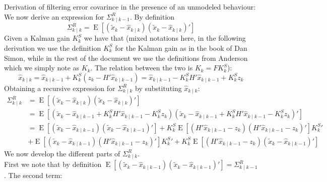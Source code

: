 \documentclass[oneside,12pt]{article}
\begin{document}
%
Derivation of filtering error covarince in the presence of an unmodeled behaviour:
We now derive an expression for $\Sigma^R_{k \mid k-1}$. By definition
%
\begin{equation}\label{eq:errCov_Real}
    \Sigma^R_{k \mid k} = \operatorname{E}\left[ (\tilde{x}_k - \hat{x}_{k \mid k}) (\tilde{x}_k - \hat{x}_{k \mid k})'\right]
\end{equation}
%
Given a Kalman gain $K_k^{S}$ we have that (mixed notations here, in the following derivation we use the definition $K_k^{S}$ for the Kalman gain as in the book of Dan Simon, while in the rest of the document we use the definitions from Anderson which we simply note as $K_k$. The relation between the two is $K_k = F K_k^S$):
%
\begin{equation}\label{eq:kalman_measUpdate}
    \hat{x}_{k \mid k} = \hat{x}_{k \mid k-1} + K_k^S(z_k - H'\hat{x}_{k \mid k-1}) = \hat{x}_{k \mid k-1} - K_k^S H'\hat{x}_{k \mid k-1} + K_k^S z_k
\end{equation}
%
Obtaining a recursive expression for $\Sigma^R_{k \mid k}$ by substituting $\hat{x}_{k \mid k}$:
%
\begin{equation}\label{eq:errCov_Real_exp}
    \begin{split}
        \Sigma^R_{k \mid k} &= \operatorname{E}\left[ (\tilde{x}_k - \hat{x}_{k \mid k}) (\tilde{x}_k - \hat{x}_{k \mid k})'\right]\\
        &= \operatorname{E}\left[ (\tilde{x}_k - \hat{x}_{k \mid k-1} + K_k^S H'\hat{x}_{k \mid k-1} - K_k^S z_k) (\tilde{x}_k - \hat{x}_{k \mid k-1} + K_k^S H'\hat{x}_{k \mid k-1} - K_k^S z_k)'\right]\\
        &= \operatorname{E}\left[ (\tilde{x}_k - \hat{x}_{k \mid k-1})(\tilde{x}_k - \hat{x}_{k \mid k-1})' \right] + K_k^S\operatorname{E}\left[ (H'\hat{x}_{k \mid k-1} - z_k)(H'\hat{x}_{k \mid k-1} - z_k)' \right]K_k^S'\\
        &+ \operatorname{E}\left[ (\tilde{x}_k - \hat{x}_{k \mid k-1})(H'\hat{x}_{k \mid k-1} - z_k)' \right]K_k^S' + K_k^S\operatorname{E}\left[ (H'\hat{x}_{k \mid k-1} - z_k)(\tilde{x}_k - \hat{x}_{k \mid k-1})' \right]
    \end{split}
\end{equation}
%
We now develop the different parts of $\Sigma^R_{k \mid k}$. \\First we note that by definition $\operatorname{E}\left[ (\tilde{x}_k - \hat{x}_{k \mid k-1})(\tilde{x}_k - \hat{x}_{k \mid k-1})' \right] = \Sigma^R_{k \mid k-1}$. The second term:
\end{document}
